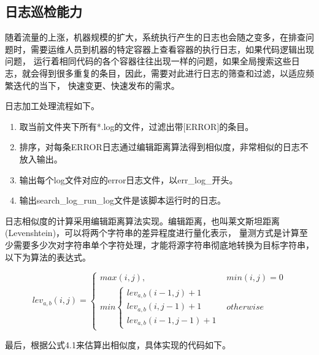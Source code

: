 \subsection{日志巡检能力}

随着流量的上涨，机器规模的扩大，系统执行产生的日志也会随之变多，在排查问题时，需要运维人员到机器的特定容器上查看容器的执行日志，如果代码逻辑出现问题，
运行着相同代码的各个容器往往出现一样的问题，如果全局搜索这些日志，就会得到很多重复的条目，因此，需要对此进行日志的筛查和过滤，以适应频繁迭代的当下，
快速变更、快速发布的需求。

日志加工处理流程如下。
\begin{enumerate}
    \item 取当前文件夹下所有*.log的文件，过滤出带[ERROR]的条目。
    \item 排序，对每条ERROR日志通过编辑距离算法得到相似度，非常相似的日志不放入输出。
    \item 输出每个log文件对应的error日志文件，以err\_log\_开头。
    \item 输出search\_log\_run\_log文件是该脚本运行时的日志。
\end{enumerate}

日志相似度的计算采用编辑距离算法实现。编辑距离，也叫莱文斯坦距离(Levenshtein)，可以将两个字符串的差异程度进行量化表示，
量测方式是计算至少需要多少次对字符串单个字符处理，才能将源字符串彻底地转换为目标字符串\cite{web1}，以下为算法的表达式。

\begin{equation}
    lev_{a,b}(i, j) =
    \begin{cases}
        max(i, j), & min(i, j) = 0 \\
        min
        \begin{cases}
            lev_{a,b}(i - 1, j) + 1 \\
            lev_{a,b}(i, j - 1) + 1 \\
            lev_{a,b}(i - 1, j - 1) + 1
        \end{cases}
        & otherwise
    \end{cases}
\end{equation}

最后，根据公式4.1来估算出相似度，具体实现的代码如下。

